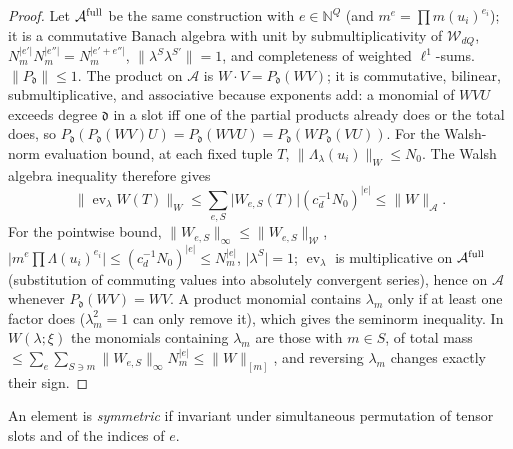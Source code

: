 \documentclass[11pt]{article}
\DeclareMathOperator{\ev}{ev}
\newcommand{\cW}{\mathcal{W}}
\newcommand{\cA}{\mathcal{A}}
\newcommand{\norm}[1]{\lVert #1\rVert}
\newcommand{\abs}[1]{\lvert #1\rvert}
\newcommand{\dg}{\mathfrak{d}}
\begin{document}
\begin{proof}
Let \(\cA^{\rm full}\) be the same construction with \(e\in\mathbb N^Q\)
(and \(m^e=\prod m(u_i)^{e_i}\)); it is a commutative Banach algebra with
unit by submultiplicativity of \(\cW_{dQ}\), \(N_m^{\abs{e'}}N_m^{\abs{e''}}=N_m^{\abs{e'+e''}}\),
\(\norm{\lambda^S\lambda^{S'}}=1\), and completeness of weighted
\(\ell^1\)-sums.  \(\norm{P_\dg}\le1\).  The product on \(\cA\) is
\(W\cdot V=P_\dg(WV)\); it is commutative, bilinear, submultiplicative, and
associative because exponents add: a monomial of \(WVU\) exceeds degree
\(\dg\) in a slot iff one of the partial products already does or the
total does, so \(P_\dg(P_\dg(WV)U)=P_\dg(WVU)=P_\dg(WP_\dg(VU))\).
For the Walsh-norm evaluation bound, at each fixed tuple \(T\),
\(\norm{\Lambda_\lambda(u_i)}_W\le N_0\).  The Walsh algebra inequality
therefore gives
\[
 \norm{\ev_\lambda W(T)}_W
 \le\sum_{e,S}\abs{W_{e,S}(T)}(c_d^{-1}N_0)^{\abs e}
 \le\norm W_\cA .
\]
For the pointwise bound, \(\norm{W_{e,S}}_\infty\le\norm{W_{e,S}}_{\cW}\),
\(\abs{m^e\prod\Lambda(u_i)^{e_i}}\le(c_d^{-1}N_0)^{\abs e}\le N_m^{\abs e}\), \(\abs{\lambda^S}=1\);
\(\ev_\lambda\) is multiplicative on \(\cA^{\rm full}\) (substitution of
commuting values into absolutely convergent series), hence on \(\cA\)
whenever \(P_\dg(WV)=WV\).
A product monomial contains \(\lambda_m\) only if at least one factor does
(\(\lambda_m^2=1\) can only remove it), which gives the seminorm
inequality.  In \(W(\lambda;\xi)\) the monomials containing \(\lambda_m\) are
those with \(m\in S\), of total mass
\(\le\sum_e\sum_{S\ni m}\norm{W_{e,S}}_\infty N_m^{\abs e}\le\norm W_{[m]}\), and
reversing \(\lambda_m\) changes exactly their sign.
\end{proof}

An element is \emph{symmetric} if invariant under simultaneous
permutation of tensor slots and of the indices of \(e\).
\end{document}
